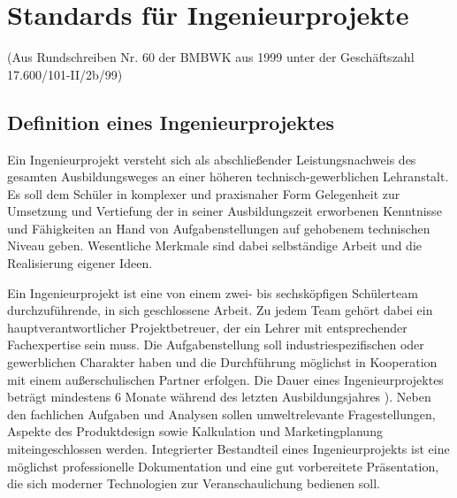

\chapter{Standards für Ingenieurprojekte}

(Aus Rundschreiben Nr. 60 der BMBWK aus 1999 unter der Geschäftszahl 17.600/101-II/2b/99) 

\section{Definition eines Ingenieurprojektes}

Ein Ingenieurprojekt versteht sich als abschließender Leistungsnachweis des gesamten Ausbildungsweges an einer höheren technisch-gewerblichen Lehranstalt. Es soll dem Schüler in komplexer und praxisnaher Form Gelegenheit zur Umsetzung und Vertiefung der in seiner Ausbildungszeit erworbenen Kenntnisse und Fähigkeiten an Hand von Aufgabenstellungen auf gehobenem technischen Niveau geben. Wesentliche Merkmale sind dabei selbständige Arbeit und die Realisierung eigener Ideen.

Ein Ingenieurprojekt ist eine von einem zwei- bis sechsköpfigen Schülerteam durchzuführende, in sich geschlossene Arbeit. Zu jedem Team gehört dabei ein hauptverantwortlicher Projektbetreuer, der ein Lehrer mit entsprechender Fachexpertise sein muss. Die Aufgabenstellung soll industriespezifischen oder gewerblichen Charakter haben und die Durchführung möglichst in Kooperation mit einem außerschulischen Partner erfolgen. Die Dauer eines Ingenieurprojektes beträgt mindestens 6 Monate während des letzten Ausbildungsjahres ). Neben den fachlichen Aufgaben und Analysen sollen umweltrelevante Fragestellungen, Aspekte des Produktdesign sowie Kalkulation und Marketingplanung miteingeschlossen werden. Integrierter Bestandteil eines Ingenieurprojekts ist eine möglichst professionelle Dokumentation und eine gut vorbereitete Präsentation, die sich moderner Technologien zur Veranschaulichung bedienen soll.


